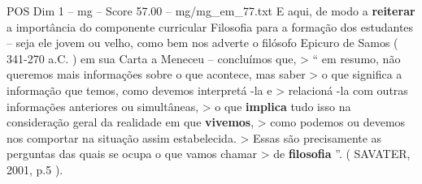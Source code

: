 \begin{textsample}{POS Dim 1 – mg – Score 57.00 – mg/mg\_em\_77.txt}
E aqui, de modo a \textbf{reiterar} a importância do componente curricular Filosofia para a formação dos estudantes – seja ele jovem ou velho, como bem nos adverte o filósofo Epicuro de Samos ( 341-270 a.C. ) em sua Carta a Meneceu – concluímos que, > “ em resumo, não queremos mais informações sobre o que acontece, mas saber > o que significa a informação que temos, como devemos interpretá -la e > relacioná -la com outras informações anteriores ou simultâneas, > o que \textbf{implica} tudo isso na consideração geral da realidade em que \textbf{vivemos}, > como podemos ou devemos nos comportar na situação assim estabelecida. > Essas são precisamente as perguntas das quais se ocupa o que vamos chamar > de \textbf{filosofia} ”. ( SAVATER, 2001, p.5 ).

\end{textsample}

